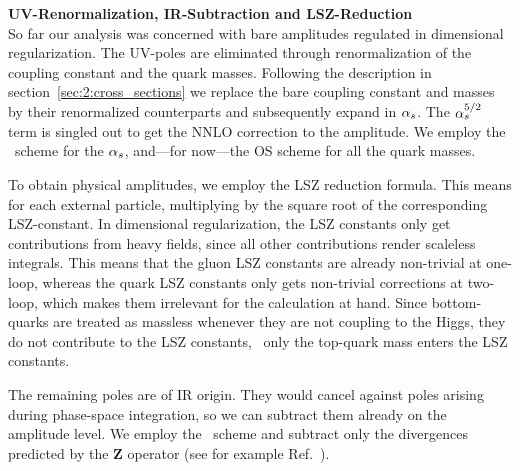 \textbf{\acs{UV}-Renormalization, \acs{IR}-Subtraction and LSZ-Reduction} \\
So far our analysis was concerned with bare amplitudes regulated in dimensional regularization. The \acs{UV}-poles are eliminated through renormalization of the coupling constant and the quark masses. Following the description in section~\ref{sec:2:cross_sections} we replace the bare coupling constant and masses by their renormalized counterparts and subsequently expand in $\alpha_s$. The $\alpha_s^{5/2}$ term is singled out to get the \acs{NNLO} correction to the amplitude. We employ the \MS\ scheme for the $\alpha_s$, and---for now---the OS scheme for all the quark masses.

To obtain physical amplitudes, we employ the LSZ reduction formula. This means for each external particle, multiplying by the square root of the corresponding LSZ-constant. In dimensional regularization, the LSZ constants only get contributions from heavy fields, since all other contributions render scaleless integrals. This means that the gluon LSZ constants are already non-trivial at one-loop, whereas the quark LSZ constants only gets non-trivial corrections at two-loop, which makes them irrelevant for the calculation at hand. Since bottom-quarks are treated as massless whenever they are not coupling to the Higgs, they do not contribute to the LSZ constants, \ie\ only the top-quark mass enters the LSZ constants.

The remaining poles are of \acs{IR} origin. They would cancel against poles arising during phase-space integration, so we can subtract them already on the amplitude level. We employ the \MS\ scheme and subtract only the divergences predicted by the $\mathbf{Z}$ operator (see for example Ref.~\cite{Czakon:2014oma}).

